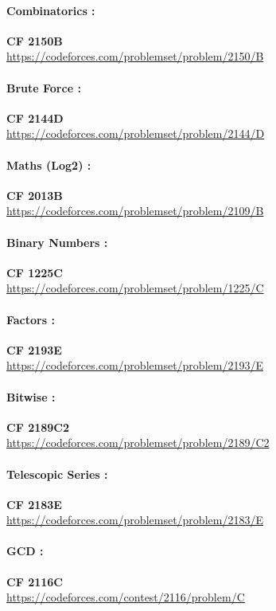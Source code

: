 \documentclass[11pt]{article}
\begin{document}
\paragraph{Combinatorics :}
\textbf{CF 2150B} \\
\url{https://codeforces.com/problemset/problem/2150/B}

\paragraph{Brute Force :}
\textbf{CF 2144D} \\
\url{https://codeforces.com/problemset/problem/2144/D}

\paragraph{Maths (Log2) :}
\textbf{CF 2013B} \\
\url{https://codeforces.com/problemset/problem/2109/B}

\paragraph{Binary Numbers :}
\textbf{CF 1225C} \\
\url{https://codeforces.com/problemset/problem/1225/C}

\paragraph{Factors :}
\textbf{CF 2193E} \\
\url{https://codeforces.com/problemset/problem/2193/E}

\paragraph{Bitwise :}
\textbf{CF 2189C2} \\
\url{https://codeforces.com/problemset/problem/2189/C2}

\paragraph{Telescopic Series :}
\textbf{CF 2183E} \\
\url{https://codeforces.com/problemset/problem/2183/E}

\paragraph{GCD : }
\textbf{CF 2116C} \\
\url{https://codeforces.com/contest/2116/problem/C}
\end{document}
